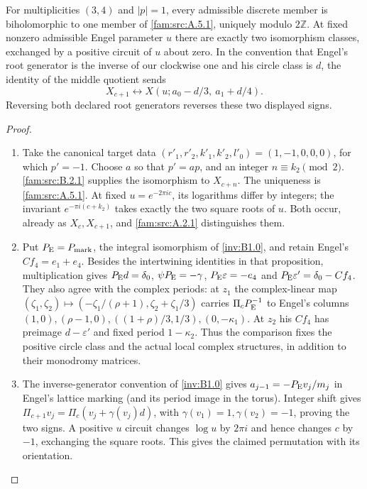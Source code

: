 \begin{proposition}\hypertarget{tag-01QC}{}\label{fam:src:B.2.2}\label{fam:st:B.2.2}

For multiplicities $(3,4)$ and $|p|=1$, every admissible discrete member is biholomorphic to one member of \ref{fam:src:A.5.1}, uniquely modulo $2\mathbb Z$. At fixed nonzero admissible Engel parameter $u$ there are exactly two isomorphism classes, exchanged by a positive circuit of $u$ about zero. In the convention that Engel's root generator is the inverse of our clockwise one and his circle class is $d$, the identity of the middle quotient sends
\[
 X_{c+1}\longleftrightarrow X(u;a_0-d/3,\ a_1+d/4).
\]
Reversing both declared root generators reverses these two displayed signs.
\end{proposition}


\begin{proof}
\begin{enumerate}[label=\arabic*.,leftmargin=*]
\item Take the canonical target data $(r'_1,r'_2,k'_1,k'_2,l'_0)=(1,-1,0,0,0)$, for which $p'=-1$. Choose $a$ so that $p'=ap$, and an integer $n\equiv k_2\pmod2$. \ref{fam:src:B.2.1} supplies the isomorphism to $X_{c+n}$. The uniqueness is \ref{fam:src:A.5.1}. At fixed $u=e^{-2\pi ic}$, its logarithms differ by integers; the invariant $e^{-\pi i(c+k_2)}$ takes exactly the two square roots of $u$. Both occur, already as $X_c,X_{c+1}$, and \ref{fam:src:A.2.1} distinguishes them.

\item Put $P_{\rm E}=P_{\rm mark}$, the integral isomorphism of
\cref{inv:B1.0}, and retain Engel's $Cf_4=e_1+e_4$.
Besides the intertwining identities in that proposition, multiplication gives
$P_{\rm E}d=\delta_0$, $\psi P_{\rm E}=-\gamma$,
$P_{\rm E}\varepsilon=-e_4$ and
$P_{\rm E}\varepsilon'=\delta_0-Cf_4$.
They also agree with the complex periods: at $z_1$ the complex-linear map
$(\zeta_1,\zeta_2)\mapsto(-\zeta_1/(\rho+1),\zeta_2+\zeta_1/3)$ carries $\Pi_cP_{\rm E}^{-1}$ to Engel's columns $(1,0),(\rho-1,0),((1+\rho)/3,1/3),(0,-\kappa_1)$. At $z_2$ his $Cf_4$ has preimage $d-\varepsilon'$ and fixed period $1-\kappa_2$. Thus the comparison fixes the positive circle class and the actual local complex structures, in addition to their monodromy matrices.

\item The inverse-generator convention of \cref{inv:B1.0} gives $a_{j-1}=-P_{\rm E}v_j/m_j$ in Engel's lattice marking (and its period image in the torus). Integer shift gives $\Pi_{c+1}v_j=\Pi_c(v_j+\gamma(v_j)d)$, with $\gamma(v_1)=1,\gamma(v_2)=-1$, proving the two signs. A positive $u$ circuit changes $\log u$ by $2\pi i$ and hence changes $c$ by $-1$, exchanging the square roots. This gives the claimed permutation with its orientation.
\end{enumerate}
\end{proof}